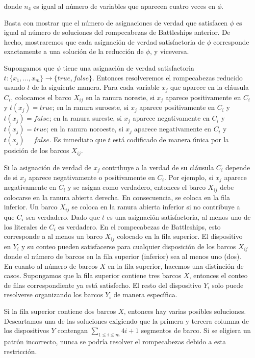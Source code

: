 \documentclass{article}
\begin{document}
donde $n_4$ es igual al número de variables que aparecen cuatro veces en $\phi$.

Basta con mostrar que el número de asignaciones de verdad que satisfacen $\phi$ es igual al número de soluciones del rompecabezas de Battleships anterior. De hecho, mostraremos que cada asignación de verdad satisfactoria de $\phi$ corresponde exactamente a una solución de la reducción de $\phi$, y viceversa.

Supongamos que $\phi$ tiene una asignación de verdad satisfactoria $t: \{x_1, \ldots, x_m\} \rightarrow \{true, false\}$. Entonces resolveremos el rompecabezas reducido usando $t$ de la siguiente manera. Para cada variable $x_j$ que aparece en la cláusula $C_i$, colocamos el barco $X_{ij}$ en la ranura noreste, si $x_j$ aparece positivamente en $C_i$ y $t(x_j) = true$; en la ranura suroeste, si $x_j$ aparece positivamente en $C_i$ y $t(x_j) = false$; en la ranura sureste, si $x_j$ aparece negativamente en $C_i$ y $t(x_j) = true$; en la ranura noroeste, si $x_j$ aparece negativamente en $C_i$ y $t(x_j) = false$. Es inmediato que $t$ está codificado de manera única por la posición de los barcos $X_{ij}$.

Si la asignación de verdad de $x_j$ contribuye a la verdad de su cláusula $C_i$ depende de si $x_j$ aparece negativamente o positivamente en $C_i$. Por ejemplo, si $x_j$ aparece negativamente en $C_i$ y se asigna como verdadero, entonces el barco $X_{ij}$ debe colocarse en la ranura abierta derecha. En consecuencia, se coloca en la fila inferior. Un barco $X_{ij}$ se coloca en la ranura abierta inferior si no contribuye a que $C_i$ sea verdadero. Dado que $t$ es una asignación satisfactoria, al menos uno de los literales de $C_i$ es verdadero. En el rompecabezas de Battleships, esto corresponde a al menos un barco $X_{ij}$ colocado en la fila superior.
El dispositivo en $Y_i$ y su conteo pueden satisfacerse para cualquier disposición de los barcos $X_{ij}$ donde el número de barcos en la fila superior (inferior) sea al menos uno (dos). En cuanto al número de barcos $X$ en la fila superior, hacemos una distinción de casos. Supongamos que la fila superior contiene tres barcos $X$, entonces el conteo de filas correspondiente ya está satisfecho. El resto del dispositivo $Y_i$ solo puede resolverse organizando los barcos $Y_i$ de manera específica.

Si la fila superior contiene dos barcos $X$, entonces hay varias posibles soluciones. Descartamos una de las soluciones exigiendo que la primera y tercera columna de los dispositivos $Y$ contengan $\sum_{1 \leq i \leq m} 4i + 1$ segmentos de barco. Si se eligiera un patrón incorrecto, nunca se podría resolver el rompecabezas debido a esta restricción.
\end{document}
